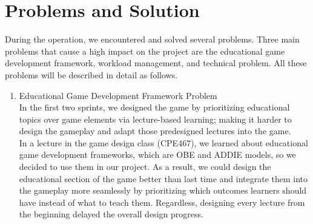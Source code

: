 \documentclass[12pt,oneside,openright,a4paper]{cpe-english-project}
\begin{document}
\section{Problems and Solution}
During the operation, we encountered and solved several problems. Three main problems that cause a high impact on the project are the educational game development framework, workload management, and technical problem. All these problems will be described in detail as follows.
\begin{enumerate}
	\item Educational Game Development Framework Problem \\
	In the first two sprints, we designed the game by prioritizing educational topics over game elements via lecture-based learning; making it harder to design the gameplay and adapt those predesigned lectures into the game. \\
	In a lecture in the game design class (CPE467), we learned about educational game development frameworks, which are OBE and ADDIE models, so we decided to use them in our project. As a result, we could design the educational section of the game better than last time and integrate them into the gameplay more seamlessly by prioritizing which outcomes learners should have instead of what to teach them. Regardless, designing every lecture from the beginning delayed the overall design progress.


\end{enumerate}
\end{document}

